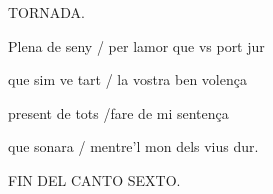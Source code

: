 \documentclass[12pt]{article}
\begin{document}
\begin{estrofaExtra}%




\begin{tornada}

TORNADA.

\end{tornada}


\end{estrofaExtra}


\begin{estrofa}

 Plena de seny / per lamor que vs port jur

 que sim ve tart / la vostra ben volen\c{c}a

 present de tots /fare de mi senten\c{c}a

 que sonara / mentre'l mon dels vius dur.

\end{estrofa}



\begin{estrofaExtra}%

\begin{final}

FIN DEL CANTO SEXTO.

\end{final}

\end{estrofaExtra}
\end{document}
